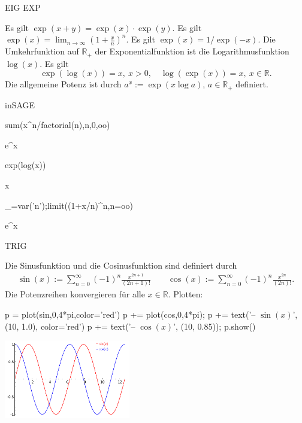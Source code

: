 \documentclass[fontsize=12pt,paper=a4,twoside,bibtotoc,idxtotoc,
liststotoc,pagesize,BCOR1.2cm,DIV15,chapterprefix,pagesize=pdftex]{scrbook}
\theoremstyle{plain}
\theoremstyle{definition}
\theoremstyle{remark}
\begin{document}
EIG EXP


 Es gilt $\exp(x+y)=\exp(x) \cdot \exp(y)$.
 Es gilt $\exp(x)=\lim_{n \rightarrow \infty} (1+\frac{x}{n})^n$.
 Es gilt $\exp(x)=1/\exp(-x)$.
 Die Umkehrfunktion auf $\mathbb{R}_+$ der Exponentialfunktion ist die
Logarithmusfunktion $\log (x)$. Es gilt
\[ \exp(\log(x))=x, \ x >0, \quad \log ( \exp ( x ))=x, \ x \in \mathbb{R}.\] 
 Die {\color{red} allgemeine Potenz} ist durch $a^x:=\exp( x \log a)$,
$a\in \mathbb{R}_+$
definiert. 


inSAGE

\begin{sagein}
sum(x^n/factorial(n),n,0,oo)
\end{sagein}
\begin{sage}
  e^x
\end{sage}
\begin{sagein}
exp(log(x))
\end{sagein}
\begin{sage}
  x
\end{sage}
\begin{sagein}
_=var('n');limit((1+x/n)^n,n=oo)
\end{sagein}
\begin{sage}
  e^x
\end{sage}
%   

TRIG

Die {\color{red} Sinusfunktion} und die {\color{red} Cosinusfunktion} sind definiert
durch
\begin{eqnarray*}
\sin(x) := \sum_{n=0}^\infty (-1)^n \frac{x^{2n+1}}{(2n+1)!} \quad\quad
\cos(x) := \sum_{n=0}^\infty (-1)^n \frac{x^{2n}}{(2n)!}. 
\end{eqnarray*}
Die Potenzreihen konvergieren für alle $x \in \mathbb{R}$. Plotten:
\begin{sagein}
p = plot(sin,0,4*pi,color='red')
p += plot(cos,0,4*pi); 
p += text('-- $\sin(x)$', (10, 1.0), color='red')
p += text('-- $\cos(x)$', (10, 0.85)); p.show()
\end{sagein}
\begin{center}
\includegraphics[width=5.5cm]{sincos.pdf}
\end{center}
\end{document}
